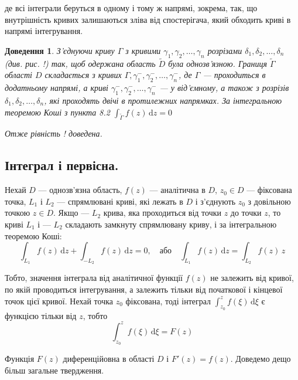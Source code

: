 \documentclass[12pt,fleqn]{article}
\theoremstyle{theorem}
\theoremstyle{proof}
\newtheorem*{dov}{Доведення}
\numberwithin{figure}{section}
\numberwithin{equation}{section}
\begin{document}
де всі інтеграли беруться в одному і тому ж напрямі, зокрема, так, що внутрішність кривих залишаються зліва від спостерігача, який обходить криві в напрямі інтегрування.

\begin{dov}
З'єднуючи криву $\Gamma$ з кривими $\gamma_1, \gamma_2, \ldots, \gamma_n$ розрізами $\delta_1, \delta_2, \ldots, \delta_n$ (див. рис. !) так, щоб одержана область $\widetilde{D}$ була однозв'язною. Границя $\widetilde{\Gamma}$ області $D$ складається з кривих $\Gamma, \gamma_1^{-}, \gamma_2^{-}, \ldots, \gamma_n^{-}$, де $\Gamma$ --- проходиться в додатньому напрямі, а криві $\gamma_1^{-}, \gamma_2^{-}, \ldots, \gamma_n^{-}$ --- у від'ємному, а також з розрізів $\delta_1, \delta_2, \ldots, \delta_n$, які проходять двічі в протилежних напрямках. За інтегральною теоремою Коші з пункта 8.2 $\int_{\widetilde{\Gamma}}f(z)\,\mathrm{d}z=0$

Отже рівність ! доведена.
\end{dov}
\newpage

\subsection{Інтеграл і первісна.}\label{8.5}\allowdisplaybreaks

Нехай $D$ --- однозв'язна область, $f(z)$ --- аналітична в $D$, $z_0 \in D$ --- фіксована точка, $L_1$ і $L_2$ --- спрямлювані криві, які лежать в $D$ і з'єднують $z_0$ з довільною точкою $z \in D$. Якщо --- $L_2$ крива, яка проходиться від точки $z$ до точки $z$, то криві $L_1$ і --- $L_2$ складають замкнуту спрямлювану криву, і за інтегральною теоремою Коші:
\[ \int_{L_1}f(z)\,\mathrm{d}z + \int_{-L_2}f(z)\,\mathrm{d}z=0, \quad \text{або} \quad \int_{L_1}f(z)\,\mathrm{d}z=\int_{L_2}f(z)\,z \]

Тобто, значення інтеграла від аналітичної функції $f(z)$ не залежить від кривої, по якій проводиться інтегрування, а залежить тільки від початкової і кінцевої точок цієї кривої. Нехай точка $z_0$ фіксована, тоді інтеграл $\int_{z_0}^{z} f(\xi) \,\mathrm{d}\xi$ є функцією тільки від $z$, тобто
\begin{equation}\label{8.5.1}
\int_{z_0}^{z} f(\xi) \,\mathrm{d}\xi = F(z)
\end{equation}

Функція $F(z)$ диференційовна в області $D$ і $F'(z)=f(z)$. Доведемо дещо більш загальне твердження.
\end{document}
